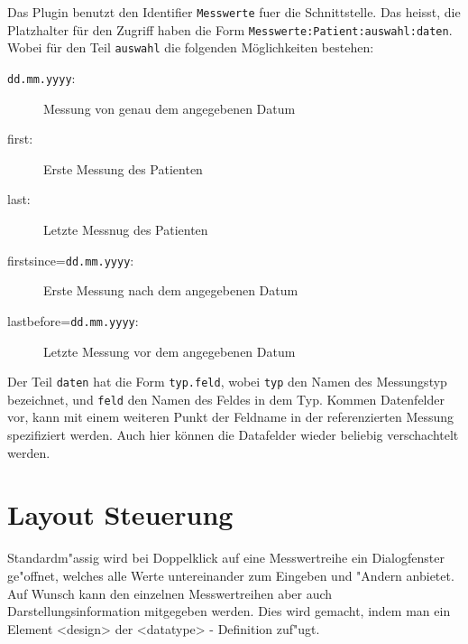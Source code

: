\documentclass[a4paper]{scrartcl}
\begin{document}
Das Plugin benutzt den Identifier \texttt{Messwerte} fuer die Schnittstelle. Das
heisst, die Platzhalter für den Zugriff haben die Form 
\texttt{Messwerte:Patient:auswahl:daten}. Wobei für den Teil \texttt{auswahl} die
folgenden Möglichkeiten bestehen:
\begin{description}
    \item[\texttt{dd.mm.yyyy}:] Messung von genau dem angegebenen Datum
    \item[first:] Erste Messung des Patienten
    \item[last:] Letzte Messnug des Patienten
    \item[firstsince=\texttt{dd.mm.yyyy}:] Erste Messung nach dem angegebenen
                                           Datum
    \item[lastbefore=\texttt{dd.mm.yyyy}:] Letzte Messung vor dem angegebenen
                                           Datum
\end{description}

Der Teil \texttt{daten} hat die Form \texttt{typ.feld}, wobei \texttt{typ} den
Namen des Messungstyp bezeichnet, und \texttt{feld} den Namen des Feldes in dem
Typ. Kommen Datenfelder vor, kann mit einem weiteren Punkt der Feldname in der
referenzierten Messung spezifiziert werden. Auch hier können die Datafelder
wieder beliebig verschachtelt werden.

\section{Layout Steuerung}
Standardm"assig wird bei Doppelklick auf eine Messwertreihe ein Dialogfenster ge"offnet, welches alle Werte untereinander zum Eingeben und "Andern anbietet. Auf Wunsch kann den einzelnen Messwertreihen aber auch Darstellungsinformation mitgegeben werden. Dies wird gemacht, indem man ein Element <design> der <datatype> - Definition zuf"ugt.
\end{document}
